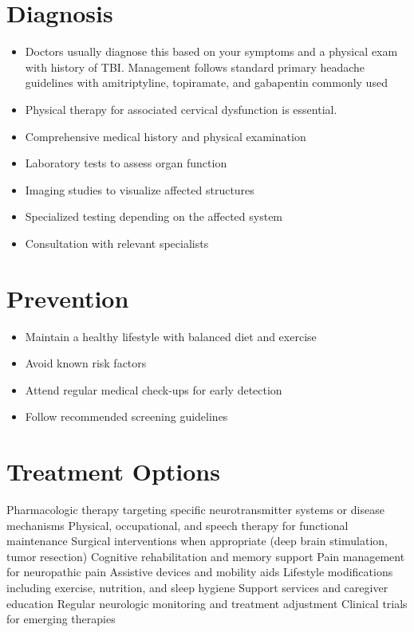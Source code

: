 \section{Diagnosis}
\begin{itemize}[noitemsep]
  \item Doctors usually diagnose this based on your symptoms and a physical exam with history of TBI. Management follows standard primary headache guidelines with amitriptyline, topiramate, and gabapentin commonly used
  \item Physical therapy for associated cervical dysfunction is essential.
  \item Comprehensive medical history and physical examination
  \item Laboratory tests to assess organ function
  \item Imaging studies to visualize affected structures
  \item Specialized testing depending on the affected system
  \item Consultation with relevant specialists
\end{itemize}
\section{Prevention}
\begin{itemize}[noitemsep]
  \item Maintain a healthy lifestyle with balanced diet and exercise
  \item Avoid known risk factors
  \item Attend regular medical check-ups for early detection
  \item Follow recommended screening guidelines
\end{itemize}
\section{Treatment Options}
Pharmacologic therapy targeting specific neurotransmitter systems or disease mechanisms Physical, occupational, and speech therapy for functional maintenance Surgical interventions when appropriate (deep brain stimulation, tumor resection) Cognitive rehabilitation and memory support Pain management for neuropathic pain Assistive devices and mobility aids Lifestyle modifications including exercise, nutrition, and sleep hygiene Support services and caregiver education Regular neurologic monitoring and treatment adjustment Clinical trials for emerging therapies

